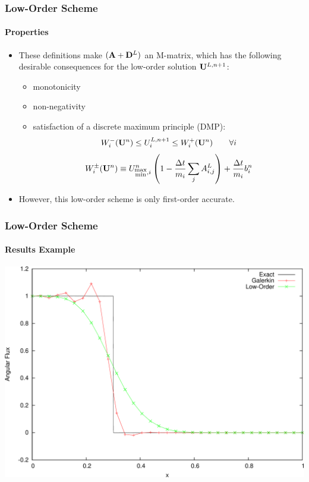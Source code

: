 \documentclass{beamer}
\begin{document}
\begin{frame}
\frametitle{Low-Order Scheme}
\framesubtitle{Properties}

\begin{itemize}
   \item These definitions make $(\mathbf{A} + \mathbf{D}^L)$ an M-matrix, which has
      the following desirable consequences for the low-order solution $\mathbf{U}^{L,n+1}$:
   \begin{itemize}
      \item monotonicity
      \item non-negativity
      \item satisfaction of a discrete maximum principle (DMP):
      \begin{equation}
         W_i^-(\mathbf{U}^n)\leq
         U_i^{L,n+1}\leq
         W_i^+(\mathbf{U}^n)\qquad\forall i
      \end{equation}
      \begin{equation}
         W_i^\pm(\mathbf{U}^n) \equiv U_{\substack{\max\\\min},i}^n\left(1-\frac{\Delta t}{m_i}
         \sum\limits_j A_{i,j}^L\right)
         + \frac{\Delta t}{m_i}b_i^n
      \end{equation}
   \end{itemize}
   \item However, this low-order scheme is only first-order accurate.
\end{itemize}

\end{frame}
\begin{frame}
\frametitle{Low-Order Scheme}
\framesubtitle{Results Example}

\includegraphics[width=\textwidth]{./figures/advection_low_order.pdf}

\end{frame}
\end{document}
